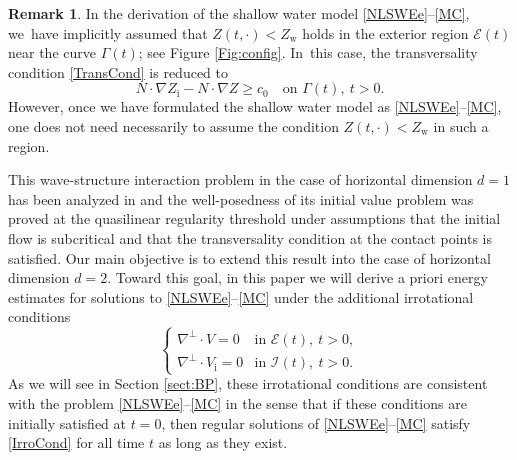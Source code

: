 \documentclass[10pt]{amsart}
\newcommand{\cI}{{\mathcal I}}
\newcommand{\cE}{{\mathcal E}}
\newcommand{\itGamma}{\mathit{\Gamma}}
\theoremstyle{definition}
\newtheorem{remark}[theorem]{Remark}
\begin{document}
\begin{remark}
In the derivation of the shallow water model \eqref{NLSWEe}--\eqref{MC}, we~have implicitly assumed that $Z(t,\cdot)<Z_\mathrm{w}$ holds in the exterior region
$\cE(t)$ near the curve $\itGamma(t)$; see Figure \ref{Fig:config}. In~this case, the transversality condition \eqref{TransCond} is reduced to
\[
N\cdot\nabla Z_\mathrm{i}-N\cdot\nabla Z \geq c_0 \quad\text{on } \itGamma(t), \ t>0.
\]
However, once we have formulated the shallow water model as \eqref{NLSWEe}--\eqref{MC},
one does not need necessarily to assume the condition $Z(t,\cdot)<Z_\mathrm{w}$ in such a region.
\end{remark}

This wave-structure interaction problem in the case of horizontal dimension $d=1$ has been analyzed in \cite{IguchiLannes2021} and
the well-posedness of its initial value problem was proved at the quasilinear regularity threshold under assumptions that
the initial flow is subcritical and that the transversality condition at the contact points is satisfied.
Our main objective is to extend this result into the case of horizontal dimension $d=2$.
Toward this goal, in this paper we will derive a priori energy estimates for solutions to \eqref{NLSWEe}--\eqref{MC} under the additional irrotational conditions
\begin{equation}\label{IrroCond}
\begin{cases}
\nabla^\perp\cdot V=0 &\text{in } \cE(t), \ t>0, \\
\nabla^\perp\cdot V_\mathrm{i}=0 &\text{in } \cI(t), \ t>0.
\end{cases}
\end{equation}
As we will see in Section \ref{sect:BP}, these irrotational conditions are consistent with the problem \eqref{NLSWEe}--\eqref{MC} in the sense that
if these conditions are initially satisfied at $t=0$, then regular solutions of \eqref{NLSWEe}--\eqref{MC} satisfy \eqref{IrroCond} for all time $t$
as long as they exist.
\end{document}
